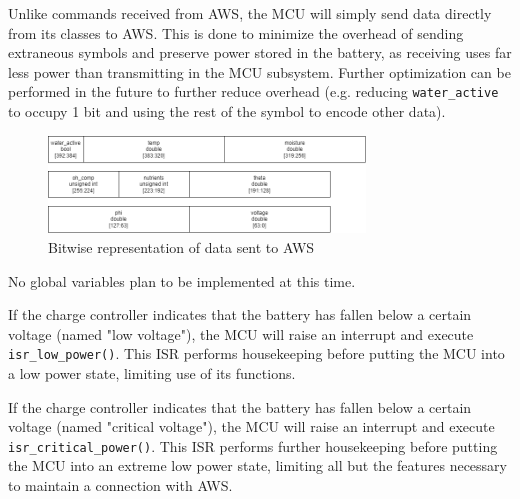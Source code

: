 \begin{flushleft}
    Unlike commands received from AWS, the MCU will simply send data directly
    from its classes to AWS. This is done to minimize the overhead of sending
    extraneous symbols and preserve power stored in the battery, as receiving
    uses far less power than transmitting in the MCU subsystem. Further
    optimization can be performed in the future to further reduce overhead
    (e.g. reducing \texttt{water\_active} to occupy 1 bit and using the rest of
    the symbol to encode other data).
    \begin{figure}[H]
        \label{toweb_encoding}
        \caption{Bitwise representation of data sent to AWS}
        \centering
        \includegraphics[width=0.75\textwidth]{images/toweb_encoding.png}
    \end{figure}
\end{flushleft}
\begin{flushleft}
    No global variables plan to be implemented at this time.
\end{flushleft}
\begin{flushleft}
\end{flushleft}
\begin{flushleft}
    If the charge controller indicates that the battery has fallen below a
    certain voltage (named "low voltage"), the MCU will raise an interrupt and
    execute \texttt{isr\_low\_power()}. This ISR performs housekeeping before
    putting the MCU into a low power state, limiting use of its functions.
\end{flushleft}
\begin{flushleft}
    If the charge controller indicates that the battery has fallen below a
    certain voltage (named "critical voltage"), the MCU will raise an interrupt
    and execute \texttt{isr\_critical\_power()}. This ISR performs further 
    housekeeping before putting the MCU into an extreme low power state,
    limiting all but the features necessary to maintain a connection with AWS.
\end{flushleft}
